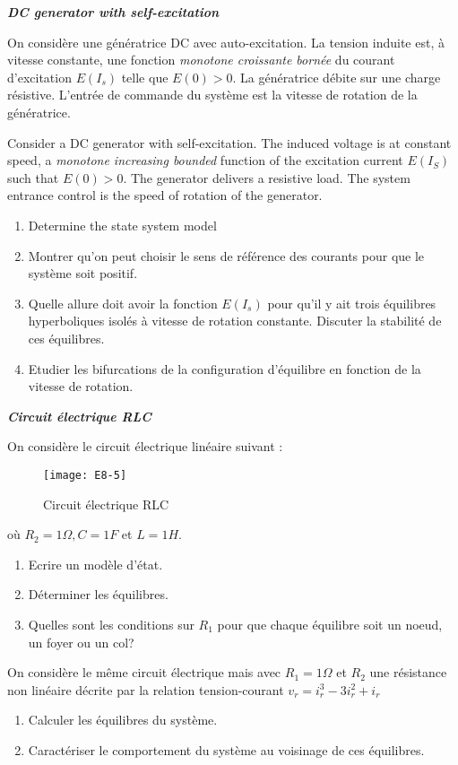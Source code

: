 \begin{exercice}{\bf \em DC generator with self-excitation}

On considère une génératrice DC avec auto-excitation. La tension induite est, à vitesse constante, une fonction {\em monotone
croissante bornée} du courant d'excitation $E(I_s)$ telle que $E(0) >
0$. La génératrice débite sur une charge résistive. L'entrée de
commande du système est la vitesse de rotation de la
génératrice.

Consider a DC generator with self-excitation. The induced voltage is at constant speed, a {\em monotone increasing bounded} 
function of  the excitation current $E( I_S)$ such that $E(0)>0$. 
The generator delivers a resistive load. The system entrance control is the speed of rotation of the
generator.

\begin{enumerate}
\item Determine the state system model
\item Montrer qu'on peut choisir le sens de référence des courants pour que le système soit positif.
\item Quelle allure doit avoir la fonction $E(I_s)$ pour qu'il y ait trois
équilibres hyperboliques isolés à vitesse de rotation constante. Discuter la
stabilité de ces équilibres.
\item Etudier les bifurcations de la configuration d'équilibre en fonction de la vitesse de rotation.
\end{enumerate}
\end{exercice}
\vv

\begin{exercice} {\bf \em Circuit électrique RLC} 

On considère le circuit électrique linéaire suivant :
\begin{figure}[h] 
   \centering
   \texttt{[image: E8-5]} 
   \caption{Circuit électrique RLC}
   \label{fig:E8-5}
\end{figure}

où $R_2 = 1\Omega, C = 1F$ et $L = 1H$.

\begin{enumerate}
\item Ecrire un modèle d'état.
\item Déterminer les équilibres.
\item Quelles sont les conditions sur $R_1$ pour que chaque équilibre soit un
noeud, un foyer ou un col?
\end{enumerate}

On considère le même circuit électrique mais avec $R_1 = 1\Omega$ et $R_2$ une résistance non
linéaire décrite par la relation tension-courant $v_r = i^3_r - 3i^2_r + i_r$
\begin{enumerate}
\item Calculer les équilibres du système.
\item Caractériser le comportement du système au voisinage de ces équilibres.
\end{enumerate}
\end{exercice}
\vv 

